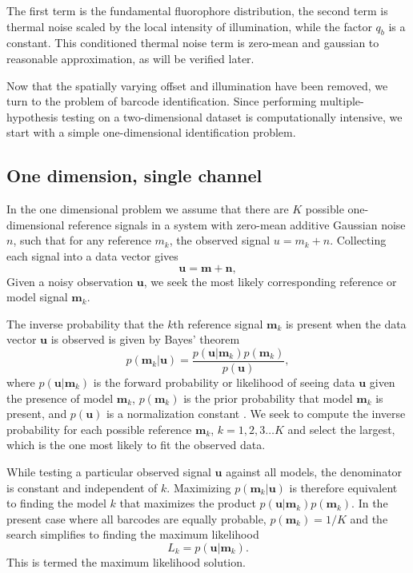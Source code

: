 The first term is the fundamental fluorophore distribution, the second term is thermal noise scaled by the local intensity of illumination, while the factor $q_b$ is a constant. This conditioned thermal noise term is zero-mean and gaussian to reasonable approximation, as will be verified later.

Now that the spatially varying offset and illumination have been removed, we turn to the problem of barcode identification. Since performing multiple-hypothesis testing on a two-dimensional dataset is computationally intensive, we start with a simple one-dimensional identification problem. 

\subsection{One dimension, single channel}
In the one dimensional problem we assume that there are $K$ possible one-dimensional reference signals in a system with zero-mean additive Gaussian noise $n$, such that for any reference $m_k$, the observed signal $u=m_k+n$. Collecting each signal into a data vector gives
\begin{equation}
\mathbf{u}=\mathbf{m} + \mathbf{n},
\end{equation}
Given a noisy observation $\mathbf{u}$, we seek the most likely corresponding reference or model signal $\mathbf{m}_k$. 

The inverse probability that the $k$th reference signal $\mathbf{m}_k$ is present when the data vector $\mathbf{u}$ is observed is given by Bayes' theorem
\begin{equation}\label{eq:Bayes}
p(\mathbf{m}_k|\mathbf{u}) = \frac{p(\mathbf{u}|\mathbf{m}_k)p(\mathbf{m}_k)} {p(\mathbf{u})},
\end{equation}
where $p(\mathbf{u}|\mathbf{m}_k)$ is the forward probability or likelihood of seeing data $\mathbf{u}$ given the presence of model $\mathbf{m}_k$, $p(\mathbf{m}_k)$ is the prior probability that model $\mathbf{m}_k$ is present, and $p(\mathbf{u})$ is a normalization constant \citep{bretthorst_probability_2003}. We seek to compute the inverse probability for each possible reference $\mathbf{m}_k$, $k=1,2,3 \ldots K$ and select the largest, which is the one most likely to fit the observed data.

While testing a particular observed signal $\mathbf{u}$ against all models, the denominator is constant and independent of $k$. Maximizing $p(\mathbf{m}_k|\mathbf{u})$ is therefore equivalent to finding the model $k$ that maximizes the product  $p(\mathbf{u}|\mathbf{m}_k)p(\mathbf{m}_k)$.
In the present case where all barcodes are equally probable,
$p(\mathbf{m}_k)=1/K$ 
and the search simplifies to finding the maximum likelihood 
\begin{equation}
L_k = p(\mathbf{u}|\mathbf{m}_k).
\end{equation}
This is termed the maximum likelihood solution.


